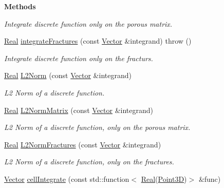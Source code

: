 \begin{Indent}{\bf Methods}
\begin{DoxyCompactItemize}
\begin{DoxyCompactList}\small\item\em Integrate discrete function only on the porous matrix. \end{DoxyCompactList}\item 
\hyperlink{namespaceFVCode3D_a40c1f5588a248569d80aa5f867080e83}{Real} \hyperlink{classFVCode3D_1_1Quadrature_ad214edec7046612f3a020199648c321c}{integrate\+Fractures} (const \hyperlink{namespaceFVCode3D_a16ccf345652402bccd1a5d2e6782526c}{Vector} \&integrand)  throw ()
\begin{DoxyCompactList}\small\item\em Integrate discrete function only on the fracturs. \end{DoxyCompactList}\item 
\hyperlink{namespaceFVCode3D_a40c1f5588a248569d80aa5f867080e83}{Real} \hyperlink{classFVCode3D_1_1Quadrature_a78618fc0f3f5ce0e8d20af98b84de66e}{L2\+Norm} (const \hyperlink{namespaceFVCode3D_a16ccf345652402bccd1a5d2e6782526c}{Vector} \&integrand)
\begin{DoxyCompactList}\small\item\em L2 Norm of a discrete function. \end{DoxyCompactList}\item 
\hyperlink{namespaceFVCode3D_a40c1f5588a248569d80aa5f867080e83}{Real} \hyperlink{classFVCode3D_1_1Quadrature_a94672e9671bb0bf9cf2e89951fd9535d}{L2\+Norm\+Matrix} (const \hyperlink{namespaceFVCode3D_a16ccf345652402bccd1a5d2e6782526c}{Vector} \&integrand)
\begin{DoxyCompactList}\small\item\em L2 Norm of a discrete function, only on the porous matrix. \end{DoxyCompactList}\item 
\hyperlink{namespaceFVCode3D_a40c1f5588a248569d80aa5f867080e83}{Real} \hyperlink{classFVCode3D_1_1Quadrature_aa55d8f4b6158bf626695a786ab43be9d}{L2\+Norm\+Fractures} (const \hyperlink{namespaceFVCode3D_a16ccf345652402bccd1a5d2e6782526c}{Vector} \&integrand)
\begin{DoxyCompactList}\small\item\em L2 Norm of a discrete function, only on the fractures. \end{DoxyCompactList}\item 
\hyperlink{namespaceFVCode3D_a16ccf345652402bccd1a5d2e6782526c}{Vector} \hyperlink{classFVCode3D_1_1Quadrature_aed4aa5c10cdca072aae596813ed179b1}{cell\+Integrate} (const std\+::function$<$ \hyperlink{namespaceFVCode3D_a40c1f5588a248569d80aa5f867080e83}{Real}(\hyperlink{classFVCode3D_1_1Point3D}{Point3D})$>$ \&func)

\end{DoxyCompactItemize}
\end{Indent}
